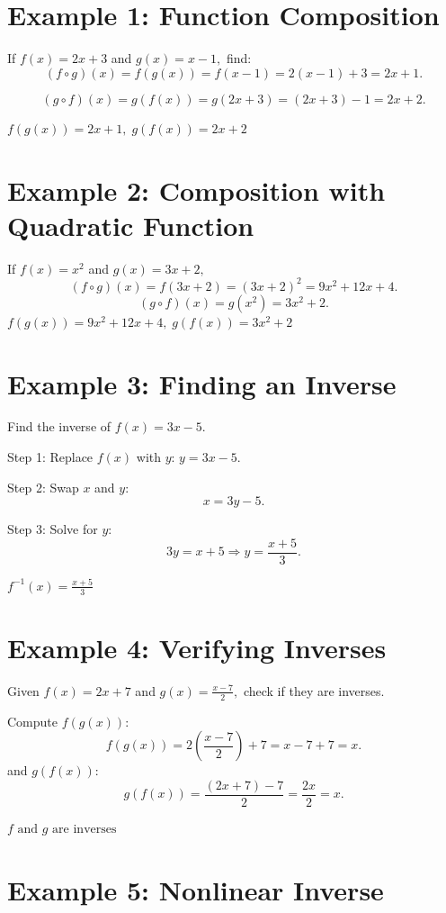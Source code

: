 \documentclass[14pt]{extarticle}
\begin{document}
\section*{Example 1: Function Composition}

If \(f(x) = 2x + 3\) and \(g(x) = x - 1,\) find:
\[
(f \circ g)(x) = f(g(x)) = f(x - 1) = 2(x - 1) + 3 = 2x + 1.
\]

\[
(g \circ f)(x) = g(f(x)) = g(2x + 3) = (2x + 3) - 1 = 2x + 2.
\]

\(\boxed{f(g(x)) = 2x + 1,\; g(f(x)) = 2x + 2}\)

\section*{Example 2: Composition with Quadratic Function}

If \(f(x) = x^2\) and \(g(x) = 3x + 2,\)
\[
(f \circ g)(x) = f(3x + 2) = (3x + 2)^2 = 9x^2 + 12x + 4.
\]
\[
(g \circ f)(x) = g(x^2) = 3x^2 + 2.
\]
\(\boxed{f(g(x)) = 9x^2 + 12x + 4,\; g(f(x)) = 3x^2 + 2}\)

\section*{Example 3: Finding an Inverse}

Find the inverse of \(f(x) = 3x - 5.\)

Step 1: Replace \(f(x)\) with \(y\): \(y = 3x - 5.\)

Step 2: Swap \(x\) and \(y\):
\[
x = 3y - 5.
\]

Step 3: Solve for \(y\):
\[
3y = x + 5 \Rightarrow y = \frac{x + 5}{3}.
\]

\(\boxed{f^{-1}(x) = \frac{x + 5}{3}}\)

\section*{Example 4: Verifying Inverses}

Given \(f(x) = 2x + 7\) and \(g(x) = \frac{x - 7}{2},\)
check if they are inverses.

Compute \(f(g(x))\):
\[
f(g(x)) = 2\left(\frac{x - 7}{2}\right) + 7 = x - 7 + 7 = x.
\]
and \(g(f(x))\):
\[
g(f(x)) = \frac{(2x + 7) - 7}{2} = \frac{2x}{2} = x.
\]

\(\boxed{f \text{ and } g \text{ are inverses}}\)

\section*{Example 5: Nonlinear Inverse}
\end{document}
